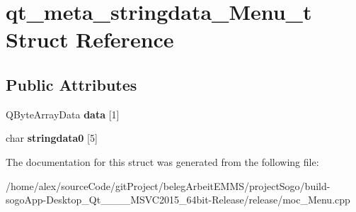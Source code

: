 \hypertarget{structqt__meta__stringdata__Menu__t}{\section{qt\-\_\-meta\-\_\-stringdata\-\_\-\-Menu\-\_\-t Struct Reference}
\label{structqt__meta__stringdata__Menu__t}
}
\subsection*{Public Attributes}
\begin{DoxyCompactItemize}
\item 
\hypertarget{structqt__meta__stringdata__Menu__t_a32af568e87291fc0cc6d146ca7c26089}{Q\-Byte\-Array\-Data {\bfseries data} \mbox{[}1\mbox{]}}\label{structqt__meta__stringdata__Menu__t_a32af568e87291fc0cc6d146ca7c26089}

\item 
\hypertarget{structqt__meta__stringdata__Menu__t_a088169a5b0977c18edfef3f9fba60ca6}{char {\bfseries stringdata0} \mbox{[}5\mbox{]}}\label{structqt__meta__stringdata__Menu__t_a088169a5b0977c18edfef3f9fba60ca6}

\end{DoxyCompactItemize}


The documentation for this struct was generated from the following file\-:\begin{DoxyCompactItemize}
\item 
/home/alex/source\-Code/git\-Project/beleg\-Arbeit\-E\-M\-M\-S/project\-Sogo/build-\/sogo\-App-\/\-Desktop\-\_\-\-Qt\-\_\-\_\-\_\-\_\-\-M\-S\-V\-C2015\-\_\-64bit-\/\-Release/release/moc\-\_\-\-Menu.\-cpp\end{DoxyCompactItemize}
